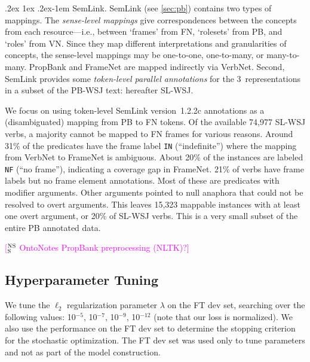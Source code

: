 \documentclass[11pt,a4paper]{article}
\makeatletter
\newcommand{\ensuretext}[1]{#1}
\newcommand{\nssmarker}{\ensuretext{\textcolor{magenta}{\ensuremath{^{\textsc{NS}}_{\textsc{S}}}}}}
\newcommand{\mkmarker}{\ensuretext{\textcolor{mdgreen}{\ensuremath{^{\textsc{M}}_{\textsc{K}}}}}}
\newcommand{\arkcomment}[3]{\ensuretext{\textcolor{#3}{[#1 #2]}}}
\newcommand{\nss}[1]{\arkcomment{\nssmarker}{#1}{magenta}}
\newcommand{\mk}[1]{\arkcomment{\mkmarker}{#1}{mdgreen}}
\renewcommand{\paragraph}{%
  \@startsection{paragraph}{4}%
  {\z@}{.2ex \@plus 1ex \@minus .2ex}{-1em}%
  {\normalfont\normalsize\bfseries}%
}
\makeatother
\begin{document}
\paragraph{SemLink.} 
SemLink (see \cref{sec:pb}) contains two types of mappings. The \emph{sense-level mappings} give correspondences between the concepts
from each resource---i.e., between `frames' from FN, `rolesets' from PB, and `roles' from VN. 
Since they map different interpretations and granularities 
of concepts, the sense-level mappings may be one-to-one, one-to-many, or many-to-many.
PropBank and FrameNet are mapped indirectly via VerbNet. %
Second, SemLink provides some \emph{token-level parallel annotations} 
for the 3~representations in a subset of the PB-WSJ text: hereafter SL-WSJ.

We focus on using token-level SemLink version~1.2.2c annotations as a (disambiguated) mapping from PB to FN tokens.
Of the available 74,977 SL-WSJ verbs, a majority cannot be mapped to FN frames for various reasons.
Around 31\% of the predicates have the frame label \texttt{IN} (``indefinite'') where the mapping from VerbNet to FrameNet is ambiguous.
About 20\% of the instances are labeled \texttt{NF} (``no frame''), indicating a coverage gap in FrameNet. 
21\% of verbs have frame labels but no frame element annotations. Most of these are predicates with modifier arguments.
Other arguments pointed to null anaphora that could not be resolved to overt arguments.
This leaves 15,323 mappable instances with at least one overt argument, or 20\% of SL-WSJ verbs. This is a very small
subset of the entire PB annotated data.

\nss{OntoNotes PropBank preprocessing (NLTK)?}

\subsection{Hyperparameter Tuning}

We tune the $\ell_2$ regularization parameter $\lambda$ on the FT dev set, searching over the following
values: 10$^{-5}$, 10$^{-7}$, 10$^{-9}$, 10$^{-12}$ (note that our loss is normalized).
We also use the performance on the FT dev set to determine the stopping criterion for the stochastic optimization. The FT dev set was used 
only to tune parameters and not as part of the model construction. 
\end{document}
